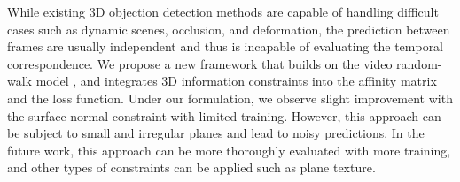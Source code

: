 
While existing 3D objection detection methods are capable of handling difficult cases such as dynamic scenes, occlusion, and deformation, the prediction between frames are usually independent and thus is incapable of evaluating the temporal correspondence. We propose a new framework that builds on the video random-walk model \cite{jabri2020walk}, and integrates 3D information constraints into the affinity matrix and the loss function. Under our formulation, we observe slight improvement with the surface normal constraint with limited training. However, this approach can be subject to small and irregular planes and lead to noisy predictions. In the future work, this approach can be more thoroughly evaluated with more training, and other types of constraints can be applied such as plane texture.